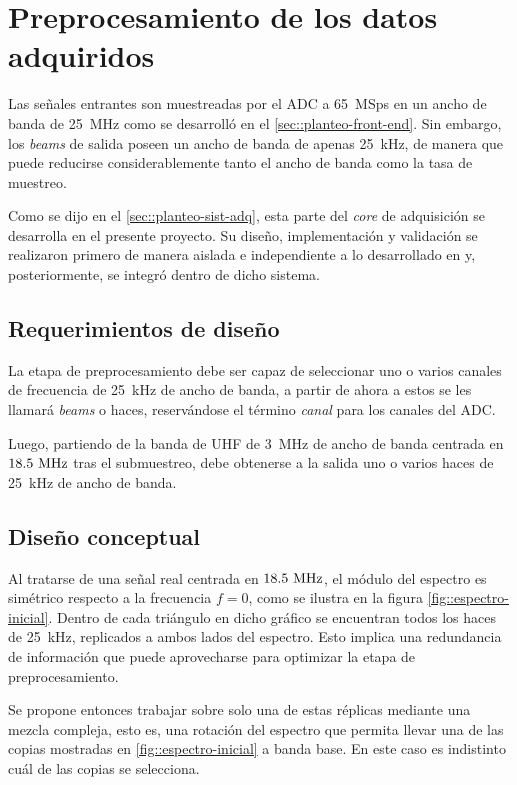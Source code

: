 \documentclass[../../main.tex]{subfiles}
\begin{document}
\graphicspath{{./figures}}
\chapter{Preprocesamiento de los datos adquiridos}\label{cap::preproc}
Las señales entrantes son muestreadas por el ADC a 65~MSps en un ancho de banda de 25~MHz como se desarrolló en el \cref{sec::planteo-front-end}. Sin embargo, los \textit{beams} de salida poseen un ancho de banda de apenas 25~kHz, de manera que puede reducirse considerablemente tanto el ancho de banda como la tasa de muestreo.

Como se dijo en el \cref{sec::planteo-sist-adq}, esta parte del \textit{core} de adquisición se desarrolla en el presente proyecto. Su diseño, implementación y validación se realizaron primero de manera aislada e independiente a lo desarrollado en \cite{proyecto-jose} y, posteriormente, se integró dentro de dicho sistema.

\section{Requerimientos de diseño}
La etapa de preprocesamiento debe ser capaz de seleccionar uno o varios canales de frecuencia de 25~kHz de ancho de banda, a partir de ahora a estos se les llamará \textit{beams} o haces, reservándose el término \textit{canal} para los canales del ADC.

Luego, partiendo de la banda de UHF de 3~MHz de ancho de banda centrada en $18.5~\textrm{MHz}$ tras el submuestreo, debe obtenerse a la salida uno o varios haces de 25~kHz de ancho de banda.

\section{Diseño conceptual}
Al tratarse de una señal real centrada en $18.5~\textrm{MHz}$, el módulo del espectro es simétrico respecto a la frecuencia $f = 0$, como se ilustra en la figura \ref{fig::espectro-inicial}. Dentro de cada triángulo en dicho gráfico se encuentran todos los haces de 25~kHz, replicados a ambos lados del espectro. Esto implica una redundancia de información que puede aprovecharse para optimizar la etapa de preprocesamiento.

Se propone entonces trabajar sobre solo una de estas réplicas mediante una mezcla compleja, esto es, una rotación del espectro  que permita llevar una de las copias mostradas en \ref{fig::espectro-inicial} a banda base. En este caso es indistinto cuál de las copias se selecciona. 
\end{document}
